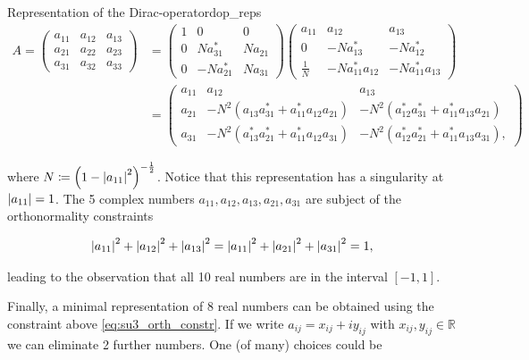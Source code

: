 \documentclass{article}
\theoremstyle{plain} %
\theoremstyle{convention} %
\theoremstyle{remark} %
\numberwithin{equation}{section}
\begin{document}
\begin{proposal}{Representation of the Dirac-operator}{dop_reps}
\begin{align*}
    A =
    \begin{pmatrix}
    a_{11} & a_{12} & a_{13} \\
    a_{21} & a_{22} & a_{23} \\
    a_{31} & a_{32} & a_{33} 
    \end{pmatrix}
    &= 
    \begin{pmatrix}
    1 & 0 & 0 \\
    0 &   N a_{31}^{*} & N a_{21} \\
    0 & - N a_{21}^{*} & N a_{31}
    \end{pmatrix}
    \begin{pmatrix}
    a_{11} & a_{12} & a_{13} \\
    0 & - N a_{13}^{*} & - N a_{12}^{*} \\
    \frac{1}{N} & - N a_{11}^{*} a_{12} & - N a_{11}^{*} a_{13}
    \end{pmatrix} \\
    &= 
    \begin{pmatrix}
    a_{11} & a_{12} & a_{13} \\
    a_{21} & -N^2 \left( a_{13} a_{31}^{*} + a_{11}^{*} a_{12} a_{21} \right) & -N^2 \left( a_{12}^{*} a_{31}^{*} + a_{11}^{*} a_{13} a_{21} \right) \\
    a_{31} & -N^2 \left( a_{13}^{*} a_{21}^{*} + a_{11}^{*} a_{12} a_{31} \right) & -N^2 \left( a_{12}^{*} a_{21}^{*} + a_{11}^{*} a_{13} a_{31} \right),
    \end{pmatrix}
\end{align*}

where $N \coloneqq \left(1 - \abs{a_{11}}^2 \right)^{-\frac{1}{2}}$. Notice that this representation has a singularity at $\abs{a_{11}}=1$. The \num{5} complex numbers $a_{11}, a_{12}, a_{13}, a_{21}, a_{31}$ are subject of the orthonormality constraints

\begin{align}
  \abs{a_{11}}^2 + \abs{a_{12}}^2 + \abs{a_{13}}^2 = \abs{a_{11}}^2 + \abs{a_{21}}^2 + \abs{a_{31}}^2 = 1, \label{eq:su3_orth_constr}
\end{align}

leading to the observation that all \num{10} real numbers are in the interval $[-1, 1].$

Finally, a minimal representation of $8$ real numbers \cite{bunk1986} can be obtained using the constraint above \eqref{eq:su3_orth_constr}. If we write $a_{ij} = x_{ij} + i y_{ij}$ with $x_{ij}, y_{ij} \in \mathbb{R}$ we can eliminate \num{2} further numbers. One (of many) choices could be


\end{proposal}
\end{document}
